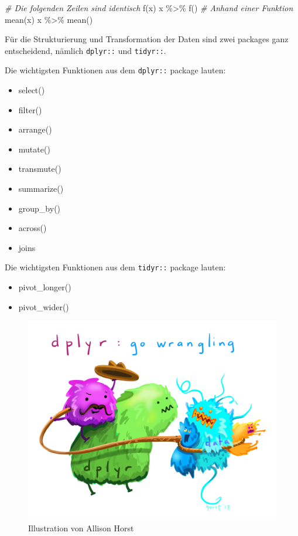 \documentclass[
]{article}
\newenvironment{Shaded}{\begin{snugshade}}{\end{snugshade}}
\newcommand{\CommentTok}[1]{\textcolor[rgb]{0.56,0.35,0.01}{\textit{#1}}}
\newcommand{\FunctionTok}[1]{\textcolor[rgb]{0.00,0.00,0.00}{#1}}
\newcommand{\NormalTok}[1]{#1}
\newcommand{\SpecialCharTok}[1]{\textcolor[rgb]{0.00,0.00,0.00}{#1}}
\providecommand{\tightlist}{%
  \setlength{\itemsep}{0pt}\setlength{\parskip}{0pt}}
\begin{document}
\begin{Shaded}
\begin{Highlighting}[]
\CommentTok{\# Die folgenden Zeilen sind identisch}
\FunctionTok{f}\NormalTok{(x)}
\NormalTok{x }\SpecialCharTok{\%\textgreater{}\%} \FunctionTok{f}\NormalTok{()}
\CommentTok{\# Anhand einer Funktion}
\FunctionTok{mean}\NormalTok{(x)}
\NormalTok{x }\SpecialCharTok{\%\textgreater{}\%} \FunctionTok{mean}\NormalTok{()}
\end{Highlighting}
\end{Shaded}

Für die Strukturierung und Transformation der Daten sind zwei packages ganz entscheidend, nämlich \texttt{dplyr::} und \texttt{tidyr::}.

Die wichtigsten Funktionen aus dem \texttt{dplyr::} package lauten:

\begin{itemize}
\tightlist
\item
  select()
\item
  filter()
\item
  arrange()
\item
  mutate()
\item
  transmute()
\item
  summarize()
\item
  group\_by()
\item
  across()
\item
  joins
\end{itemize}

Die wichtigsten Funktionen aus dem \texttt{tidyr::} package lauten:

\begin{itemize}
\tightlist
\item
  pivot\_longer()
\item
  pivot\_wider()
\end{itemize}

\begin{figure}

{\centering \includegraphics[width=1\linewidth]{images/032} 

}

\caption{Illustration von Allison Horst}\label{fig:unnamed-chunk-124}
\end{figure}
\end{document}

